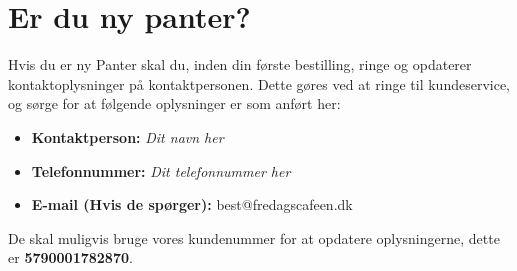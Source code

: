 \section{Er du ny panter?}
\label{sec:Er du ny Panter?}

Hvis du er ny Panter skal du, inden din første bestilling, ringe og opdaterer kontaktoplysninger på kontaktpersonen.
Dette gøres ved at ringe til \DRS kundeservice, og sørge for at følgende oplysninger er som anført her:

\begin{itemize}
	\item \textbf{Kontaktperson:} \textit{Dit navn her}
	\item \textbf{Telefonnummer:} \textit{Dit telefonnummer her}
	\item \textbf{E-mail (Hvis de spørger):} best@fredagscafeen.dk
\end{itemize}

De skal muligvis bruge vores kundenummer for at opdatere oplysningerne, dette er \textbf{5790001782870}.



